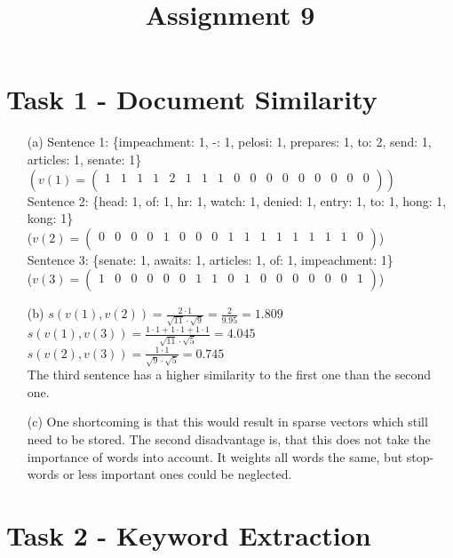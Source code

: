 \documentclass[a4paper]{article}
\date{}
\author{}
\title{\textbf{Assignment 9}}
\begin{document}
\maketitle 
\thispagestyle{fancy}


\section*{Task 1 - Document Similarity}

\begin{enumerate}
	\item[(a)] Sentence 1: \{impeachment: 1, -: 1, pelosi: 1, prepares: 1, to: 2, send: 1, articles: 1, senate: 1\} \\
	$(v(1) = \begin{pmatrix} 1 & 1 & 1 & 1 & 2 & 1 & 1 & 1 & 0 & 0 & 0 & 0 & 0 & 0 & 0 & 0 & 0 \\ \end{pmatrix})$ \\
	Sentence 2: \{head: 1, of: 1, hr: 1, watch: 1, denied: 1, entry: 1, to: 1, hong: 1, kong: 1\} \\
	($v(2) = \begin{pmatrix} 0 & 0 & 0 & 0 & 1 & 0 & 0 & 0 & 1 & 1 & 1 & 1 & 1 & 1 & 1 & 1 & 0 \\ \end{pmatrix}$)\\
	Sentence 3: \{senate: 1, awaits: 1, articles: 1, of: 1, impeachment: 1\}\\	
	($v(3) = \begin{pmatrix} 1 & 0 & 0 & 0 & 0 & 0 & 1 & 1 & 0 & 1 & 0 & 0 & 0 & 0 & 0 & 0 & 1 \\ \end{pmatrix}$)
	\item[(b)] $s(v(1), v(2)) = \frac{2 \cdot 1}{\sqrt{11} \cdot \sqrt{9}} = \frac{2}{9.95} = 1.809$ \\ \linebreak
	$s(v(1), v(3)) = \frac{1 \cdot 1 + 1 \cdot 1 + 1 \cdot 1}{\sqrt{11} \cdot \sqrt{5}} = 4.045$ \\ \linebreak
	$s(v(2), v(3)) = \frac{1 \cdot 1}{\sqrt{9} \cdot \sqrt{5}} = 0.745$ \\ \linebreak	
	The third sentence has a higher similarity to the first one than the second one. 
	
	\item[(c)] 
	One shortcoming is that this would result in sparse vectors which still need to be stored. 
	The second disadvantage is, that this does not take the importance of words into account. 
	It weights all words the same, but stop-words or less important ones could be neglected. 
	
	
\end{enumerate}




\section*{Task 2 - Keyword Extraction}
\end{document}
